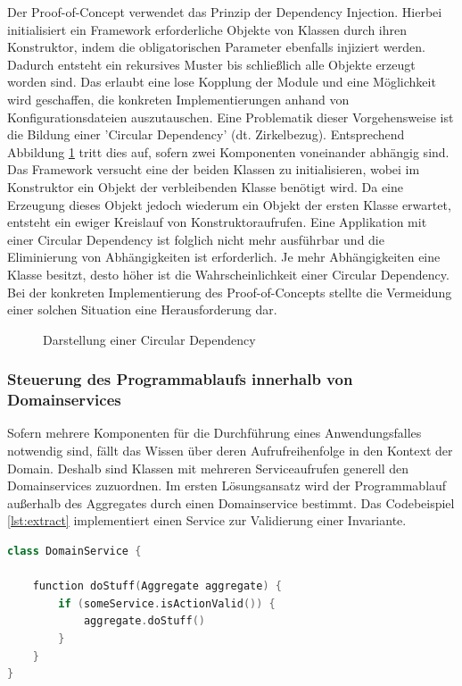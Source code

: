 Der Proof-of-Concept verwendet das Prinzip der Dependency Injection. Hierbei initialisiert ein Framework erforderliche Objekte von Klassen durch ihren Konstruktor, indem die obligatorischen Parameter ebenfalls injiziert werden. Dadurch entsteht ein rekursives Muster bis schließlich alle Objekte erzeugt worden sind. Das erlaubt eine lose Kopplung der Module und eine Möglichkeit wird geschaffen, die konkreten Implementierungen anhand von Konfigurationsdateien auszutauschen. Eine Problematik dieser Vorgehensweise ist die Bildung einer 'Circular Dependency' (dt. Zirkelbezug). Entsprechend Abbildung \ref{fig:circulardependency} tritt dies auf, sofern zwei Komponenten voneinander abhängig sind. Das Framework versucht eine der beiden Klassen zu initialisieren, wobei im Konstruktor ein Objekt der verbleibenden Klasse benötigt wird. Da eine Erzeugung dieses Objekt jedoch wiederum ein Objekt der ersten Klasse erwartet, entsteht ein ewiger Kreislauf von Konstruktoraufrufen. Eine Applikation mit einer Circular Dependency ist folglich nicht mehr ausführbar und die Eliminierung von Abhängigkeiten ist erforderlich. Je mehr Abhängigkeiten eine Klasse besitzt, desto höher ist die Wahrscheinlichkeit einer Circular Dependency. Bei der konkreten Implementierung des Proof-of-Concepts stellte die Vermeidung einer solchen Situation eine Herausforderung dar. \cite[S. 93ff.]{Suryanarayana.2015}

\begin{figure}[htbp]
	\centering
	\footnotesize
	
	\caption{Darstellung einer Circular Dependency}
	\label{fig:circulardependency}
\end{figure}


\subsubsection{Steuerung des Programmablaufs innerhalb von Domainservices}

Sofern mehrere Komponenten für die Durchführung eines Anwendungsfalles notwendig sind, fällt das Wissen über deren Aufrufreihenfolge in den Kontext der Domain. Deshalb sind Klassen mit mehreren Serviceaufrufen generell den Domainservices zuzuordnen. Im ersten Lösungsansatz wird der Programmablauf außerhalb des Aggregates durch einen Domainservice bestimmt. Das Codebeispiel \ref{lst:extract} implementiert einen Service zur Validierung einer Invariante.

\vspace{0.5cm}
\begin{minipage}{\linewidth} %
	\begin{lstlisting}[caption={Bestimmung des Steuerflusses durch einen Domainservice}, label={lst:extract}, language=Kotlin]
class DomainService {
	
	function doStuff(Aggregate aggregate) {
		if (someService.isActionValid()) {     
			aggregate.doStuff()
		}
	}
}
	\end{lstlisting}
\end{minipage}


